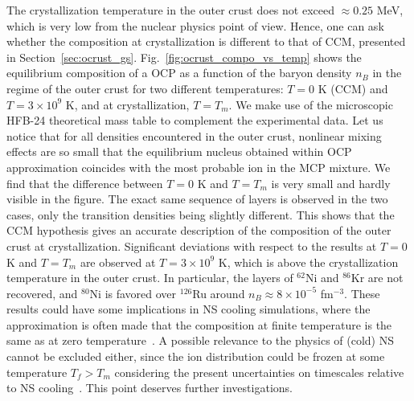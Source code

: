 The crystallization temperature in the outer crust does not exceed $\approx
0.25$ MeV, which is very low from the nuclear physics point of view. Hence, one
can ask whether the composition at crystallization is different to that of
CCM, presented in Section~\ref{sec:ocrust_gs}.
Fig.~\ref{fig:ocrust_compo_vs_temp} shows the equilibrium composition of a OCP
as a function of the baryon density $n_B$ in the regime of the outer crust for
two different temperatures: $T=0$ K (CCM) and $T=3\times 10^9$ K, and at 
crystallization, $T=T_m$. We make use of the microscopic HFB-24 theoretical 
mass table to complement the experimental data.
Let us notice that for all densities encountered in the outer crust, nonlinear 
mixing effects are so small that the equilibrium nucleus obtained within OCP 
approximation coincides with the most probable ion in the MCP mixture.
We find that the difference between $T=0$ K and $T=T_m$ is very small and 
hardly visible in the figure. The exact same sequence of layers is observed in 
the two cases, only the transition densities being slightly different.
This shows that the CCM hypothesis gives an accurate description of the 
composition of the outer crust at crystallization.
Significant deviations with respect to the results at $T=0$ K and $T=T_m$ are 
observed at $T=3\times 10^9$ K, which is above the crystallization temperature
in the outer crust. In particular, the layers of $^{62}$Ni and $^{86}$Kr are 
not recovered, and $^{80}$Ni is favored over $^{126}$Ru around $n_B \approx 
8\times 10^{-5}$ fm$^{-3}$. 
These results could have some implications in NS cooling simulations,
where the approximation is often made that the composition at finite
temperature is the same as at zero temperature~\cite{Fortin2010}. A possible
relevance to the physics of (cold) NS cannot be excluded either, since the ion
distribution could be frozen at some temperature $T_f>T_m$ considering the
present uncertainties on timescales relative to NS cooling~\cite{Goriely2011}.
This point deserves further investigations.

